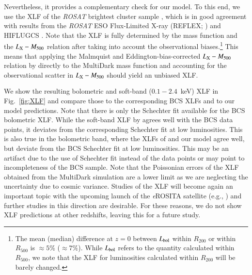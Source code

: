 \documentclass[useAMS,usenatbib]{mn2e}
\begin{document}
Nevertheless, it provides a complementary check for our model. To this end, we
use the XLF of the \emph{ROSAT} brightest cluster sample
\citep[BCS][]{1997ApJ...479L.101E}, which is in good agreement with results from
the \emph{ROSAT} ESO Flux-Limited X-ray (REFLEX; \citealp{2002ApJ...566...93B})
and HIFLUGCS \citep{2002ApJ...567..716R}.  Note that the XLF is fully determined
by the mass function and the $L_{{\mathrm{X}}}-M_{500}$ relation after taking into
account the observational biases.\footnote{The mean (median) difference at $z=0$
  between $L_{{\mathrm{bol}}}$ within $R_{200}$ or within $R_{500}$ is $\approx 5\%$
  ($\approx 7\%$). While $L_{{\mathrm{bol}}}$ refers to the quantity calculated
  within $R_{500}$, we note that the XLF for luminosities calculated within
  $R_{200}$ will be barely changed.} This means that applying the Malmquist and
Eddington-bias-corrected $L_{{\mathrm{X}}}-M_{500}$ relation by
\cite{2010MNRAS.406.1773M} directly to the MultiDark mass function and
accounting for the observational scatter in $L_{{\mathrm{X}}}-M_{500}$ should yield
an unbiased XLF. 

We show the resulting bolometric and soft-band ($0.1-2.4$~keV) XLF in
Fig.~\ref{fig:XLF} and compare those to the corresponding BCS XLFs and to our
model predictions. Note that there is only the Schechter fit available for the
BCS bolometric XLF.  While the soft-band XLF by \cite{2010MNRAS.406.1773M}
agrees well with the BCS data points, it deviates from the corresponding
Schechter fit at low luminosities. This is also true in the bolometric band,
where the XLFs of \cite{2010MNRAS.406.1773M} and our model agree well, but
deviate from the BCS Schechter fit at low luminosities. This may be an artifact
due to the use of Schechter fit instead of the data points or may point to
incompleteness of the BCS sample. Note that the Poissonian errors of the XLF
obtained from the MultiDark simulation are a lower limit as we are neglecting
the uncertainty due to cosmic variance.  Studies of the XLF will become again an
important topic with the upcoming launch of the \emph{e}ROSITA satellite (e.g.,
\citealp{2011MSAIS..17..159C}) and further studies in this direction are
desirable. For these reasons, we do not show XLF predictions at other redshifts,
leaving this for a future study.


\end{document}
